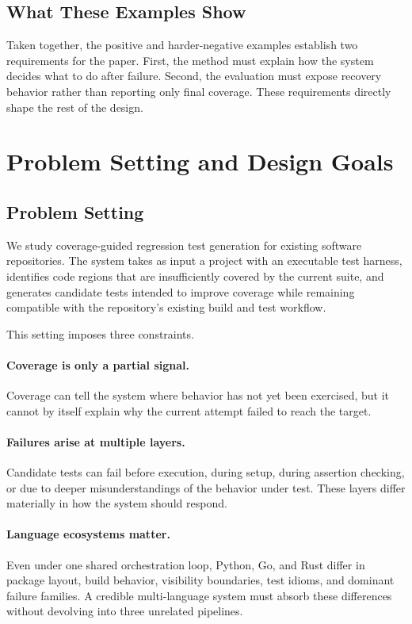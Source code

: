\documentclass[10pt]{article}
\begin{document}
\subsection{What These Examples Show}

Taken together, the positive and harder-negative examples establish two requirements for the paper. First, the method must explain how the system decides what to do after failure. Second, the evaluation must expose recovery behavior rather than reporting only final coverage. These requirements directly shape the rest of the design.

\section{Problem Setting and Design Goals}
\label{sec:problem}

\subsection{Problem Setting}

We study coverage-guided regression test generation for existing software repositories. The system takes as input a project with an executable test harness, identifies code regions that are insufficiently covered by the current suite, and generates candidate tests intended to improve coverage while remaining compatible with the repository's existing build and test workflow.

This setting imposes three constraints.

\paragraph{Coverage is only a partial signal.}
Coverage can tell the system where behavior has not yet been exercised, but it cannot by itself explain why the current attempt failed to reach the target.

\paragraph{Failures arise at multiple layers.}
Candidate tests can fail before execution, during setup, during assertion checking, or due to deeper misunderstandings of the behavior under test. These layers differ materially in how the system should respond.

\paragraph{Language ecosystems matter.}
Even under one shared orchestration loop, Python, Go, and Rust differ in package layout, build behavior, visibility boundaries, test idioms, and dominant failure families. A credible multi-language system must absorb these differences without devolving into three unrelated pipelines.
\end{document}
